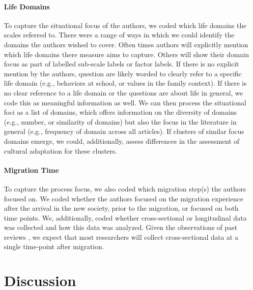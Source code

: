 \documentclass[man, 12pt, a4paper]{apa7}
\begin{document}
\paragraph{Life Domains}
To capture the situational focus of the authors, we coded which life domains the scales referred to. There were a range of ways in which we could identify the domains the authors wished to cover. Often times authors will explicitly mention which life domains there measure aims to capture. Others will show their domain focus as part of labelled sub-scale labels or factor labels. If there is no explicit mention by the authors, question are likely worded to clearly refer to a specific life domain (e.g., behaviors at school, or values in the family context). If there is no clear reference to a life domain or the questions are about life in general, we code this as meaningful information as well. We can then process the situational foci as a list of domains, which offers information on the diversity of domains (e.g., number, or similarity of domains) but also the focus in the literature in general (e.g., frequency of domain across all articles). If clusters of similar focus domains emerge, we could, additionally, assess differences in the assessment of cultural adaptation for these clusters.

\paragraph{Migration Time}
To capture the process focus, we also coded which migration step(s) the authors focused on. We coded whether the authors focused on the migration experience after the arrival in the new society, prior to the migration, or focused on both time points. We, additionally, coded whether cross-sectional or longitudinal data was collected and how this data was analyzed. Given the observations of past reviews \citep[e.g.,][]{Brown2011, Ward2019}, we expect that most researchers will collect cross-sectional data at a single time-point after migration.













\section{Discussion}
\end{document}
